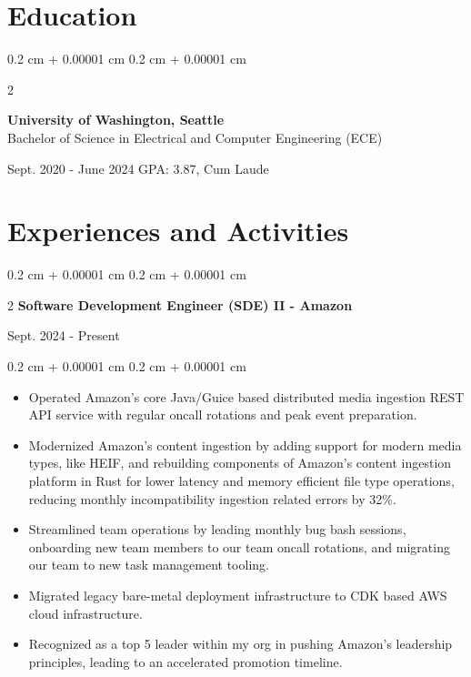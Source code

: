 \documentclass[10pt, letterpaper]{article}
\newenvironment{highlightsforbulletentries}{
    \begin{itemize}[
        topsep=0.10 cm,
        parsep=0.10 cm,
        partopsep=0pt,
        itemsep=0pt,
        leftmargin=10pt
    ]
}{
    \end{itemize}
} %
\newenvironment{onecolentry}{
    \begin{adjustwidth}{
        0.2 cm + 0.00001 cm
    }{
        0.2 cm + 0.00001 cm
    }
}{
    \end{adjustwidth}
} %
\newenvironment{twocolentry}[2][]{
    \onecolentry
    \def\secondColumn{#2}
    \setcolumnwidth{\fill, 4.5 cm}
    \begin{paracol}{2}
}{
    \switchcolumn \raggedleft \secondColumn
    \end{paracol}
    \endonecolentry
} %
\begin{document}
    \section{Education}
        \begin{twocolentry}{
            Sept. 2020 - June 2024
            GPA: 3.87, Cum Laude
        }
            \textbf{University of Washington, Seattle}\\
            Bachelor of Science in Electrical and Computer Engineering (ECE)
        \end{twocolentry}

    \section{Experiences and Activities}
        \begin{twocolentry}{
            Sept. 2024 - Present
        }{
            \textbf{Software Development Engineer (SDE) II - Amazon}
        }
        \end{twocolentry}
        \vspace{0.1 cm}
        \begin{onecolentry}
            \begin{highlightsforbulletentries}
                \item Operated Amazon's core Java/Guice based distributed media ingestion REST API service with regular oncall rotations and peak event preparation.
                \item Modernized Amazon's content ingestion by adding support for modern media types, like  HEIF, and rebuilding components of Amazon's content ingestion platform in Rust for lower latency and memory efficient file type operations, reducing monthly incompatibility ingestion related errors by 32\%.
                \item Streamlined team operations by leading monthly bug bash sessions, onboarding new team members to our team oncall rotations, and migrating our team to new task management tooling.
                \item Migrated legacy bare-metal deployment infrastructure to CDK based AWS cloud infrastructure.
                \item Recognized as a top 5 leader within my org in pushing Amazon's leadership principles, leading to an accelerated promotion timeline.
            \end{highlightsforbulletentries}
        \end{onecolentry}
\end{document}
